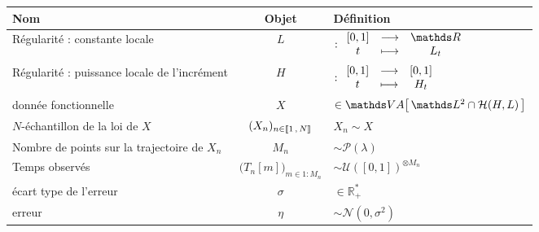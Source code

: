 \begin{figure}[H]
	\noindent\begin{tabularx}{\textwidth}{XcX}
		\toprule
		\textbf{Nom}                                 & \textbf{Objet}                              & \textbf{Définition}                                                                                                \\
		\midrule
		Régularité : constante locale                & $L$                                         & $: \func{[0,1]}{\mathds R}{t}{L_t}$                                                                                \\
		Régularité : puissance locale de l'incrément & $H$                                         & $: \begin{array}{ccc} [0,1] &\longrightarrow& [0,1] \\ t &\longmapsto& H_t \end{array}$                                                                                    \\
		donnée fonctionnelle                         & $X$                                         & $\in \VA{ \mathds L^2 \cap \mathcal H(H, L) }$                                                                     \\
		$N$-échantillon de la loi de $X$             & $(X_n)_{n \in \llbracket 1 \, , \, N \rrbracket}$           & $X_n \sim X$                                                                                                       \\
		\midrule
		Nombre de points sur la trajectoire de $X_n$ & $M_n$                                       & $\sim \mathcal P(\lambda)$                                                                                         \\
		Temps observés                               & $\bigl(T_n[m]\bigr)_{m \in 1:M_n}$          & $\sim \mathcal U( [0,1] )^{\otimes M_n}$                                                                           \\
		\midrule
		écart type de l'erreur                       & $\sigma$                                    & $\in \mathds R_+^*$                                                                                                \\
		erreur                                       & $\eta$                                      & $\sim \mathcal N(0, \sigma^2)$                                                                                     \\

\end{tabularx}
\end{figure}
